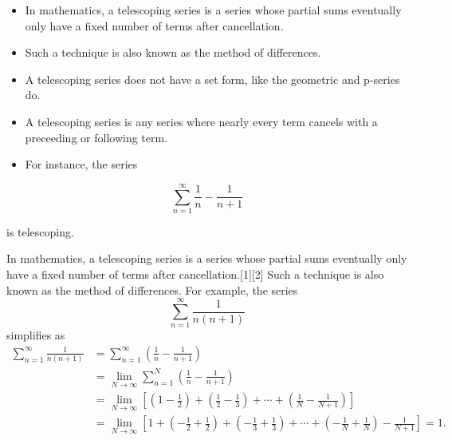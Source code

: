 \documentclass{article}
\begin{document}


	
	\Large
	\begin{itemize}
	\item In mathematics, a telescoping series is a series whose partial sums eventually only have a fixed number of terms after cancellation.
	\item Such a technique is also known as the method of differences.
	\end{itemize}




	
	\Large
	
	\begin{itemize}
	\item A telescoping series does not have a set form, like the geometric and p-series do. \item A telescoping series is any series where nearly every term cancels with a preceeding or following term. \item For instance, the series
	\end{itemize}


\[   \sum^{\infty}_{n=1} \frac{1}{n} - \frac{1}{n+1} \]

is telescoping. 



In mathematics, a telescoping series is a series whose partial sums eventually only have a fixed number of terms after cancellation.[1][2] Such a technique is also known as the method of differences.
For example, the series
\[\sum_{n=1}^\infty\frac{1}{n(n+1)}\]
simplifies as
\[\begin{align}
\sum_{n=1}^\infty \frac{1}{n(n+1)} & {} = \sum_{n=1}^\infty \left( \frac{1}{n} - \frac{1}{n+1} \right) \\
{} & {} = \lim_{N\to\infty} \sum_{n=1}^N \left( \frac{1}{n} - \frac{1}{n+1} \right) \\
{} & {} = \lim_{N\to\infty} \left\lbrack {\left(1 - \frac{1}{2}\right) + \left(\frac{1}{2} - \frac{1}{3}\right) + \cdots + \left(\frac{1}{N} - \frac{1}{N+1}\right) } \right\rbrack  \\
{} & {} = \lim_{N\to\infty} \left\lbrack {  1 + \left( - \frac{1}{2} + \frac{1}{2}\right) + \left( - \frac{1}{3} + \frac{1}{3}\right) + \cdots + \left( - \frac{1}{N} + \frac{1}{N}\right) - \frac{1}{N+1} } \right\rbrack = 1.
\end{align}\]
\end{document}
